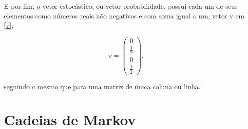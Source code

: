 \noindent E por fim, o vetor estocástico, ou vetor probabilidade, possui cada um de seus elementos como números reais não negativos e com soma igual a um, vetor v em \eqref{v},

\begin{equation}\label{v}
v = \begin{pmatrix}
	0	\\	\frac{1}{2}	\\	0	\\	\frac{1}{2}
	\end{pmatrix},
\end{equation}

\noindent seguindo o mesmo que para uma matriz de única coluna ou linha.





%
%



\section{Cadeias de Markov}%

